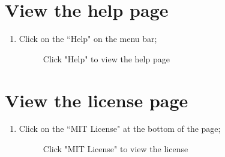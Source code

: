 \documentclass[ManualeUtente]{subfiles}
\begin{document}
\section{View the help page}
\begin{enumerate}
	\item Click on the \textquotedblleft Help" on the menu bar;
	\begin{figure}[H]
		\centering
		\caption{Click "Help" to view the help page}
		\label{fig:Click "Help" to view the help page}
	\end{figure}
\end{enumerate}

\section{View the license page}
\begin{enumerate}
	\item Click on the \textquotedblleft MIT License" at the bottom of the page;
	\begin{figure}[H]
		\centering
		\caption{Click "MIT License" to view the license}
		\label{fig:Click "MIT License" to view the license}
	\end{figure}
\end{enumerate}
\end{document}
